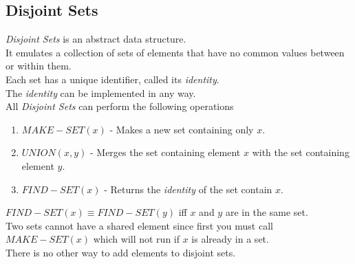\documentclass[11pt,a4paper]{article}
\begin{document}
\subsection{Disjoint Sets}

\textit{Disjoint Sets} is an abstract data structure.\\
It emulates a collection of sets of elements that have no common values between or within them.\\
Each set has a unique identifier, called its \textit{identity}.\\
The \textit{identity} can be implemented in any way.\\
All \textit{Disjoint Sets} can perform the following operations
\begin{enumerate}[label=\roman*)]
  \item $MAKE-SET(x)$ - Makes a new set containing only $x$.
  \item $UNION(x,y)$ - Merges the set containing element $x$ with the set containing element $y$.
  \item $FIND-SET(x)$ - Returns the \textit{identity} of the set contain $x$.
\end{enumerate}

$FIND-SET(x)\equiv FIND-SET(y)$ iff $x$ and $y$ are in the same set.\\

Two sets cannot have a shared element since first you must call $MAKE-SET(x)$ which will not run if $x$ is already in a set.\\
There is no other way to add elements to disjoint sets.\\
\end{document}
